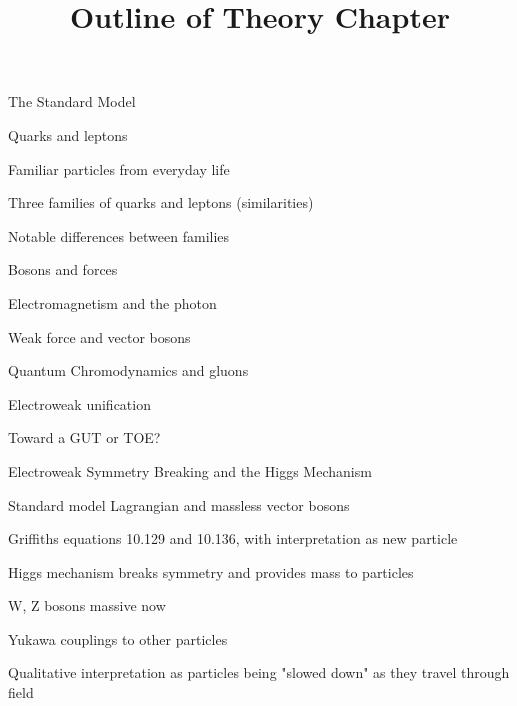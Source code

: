 \documentclass[11pt]{report}
\title{Outline of Theory Chapter}
\begin{document}
\begin{outline}

	\item The Standard Model
	\begin{outline}
		\item Quarks and leptons
		\begin{outline}
			\item Familiar particles from everyday life
			\item Three families of quarks and leptons (similarities)
			\item Notable differences between families
		\end{outline}
		\item Bosons and forces
		\begin{outline}
			\item Electromagnetism and the photon
			\item Weak force and vector bosons
			\item Quantum Chromodynamics and gluons
			\item Electroweak unification
			\item Toward a GUT or TOE?
		\end{outline}
	\end{outline}
	
	\item Electroweak Symmetry Breaking and the Higgs Mechanism
	\begin{outline}
		\item Standard model Lagrangian and massless vector bosons
		\begin{outline}
			\item Griffiths equations 10.129 and 10.136, with interpretation as new particle
		\end{outline}
		\item Higgs mechanism breaks symmetry and provides mass to particles
		\begin{outline}
			\item W, Z bosons massive now
			\item Yukawa couplings to other particles 
			\item Qualitative interpretation as particles being "slowed down" as they travel through field
		\end{outline}
	\end{outline}
	

\end{outline}
\end{document}
